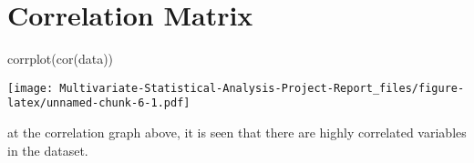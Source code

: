 \documentclass[12pt,twoside]{deuthesis}
\newenvironment{Shaded}{\begin{snugshade}}{\end{snugshade}}
\newcommand{\FunctionTok}[1]{\textcolor[rgb]{0.00,0.00,0.00}{#1}}
\newcommand{\NormalTok}[1]{#1}
\begin{document}
\hypertarget{correlation-matrix}{%
\section{Correlation Matrix}\label{correlation-matrix}}
\begin{Shaded}
\begin{Highlighting}[]
\FunctionTok{corrplot}\NormalTok{(}\FunctionTok{cor}\NormalTok{(data))}
\end{Highlighting}
\end{Shaded}
\texttt{[image: Multivariate-Statistical-Analysis-Project-Report\_files/figure-latex/unnamed-chunk-6-1.pdf]}

at the correlation graph above, it is seen that there are highly correlated variables in the dataset.

\pagebreak
\end{document}

